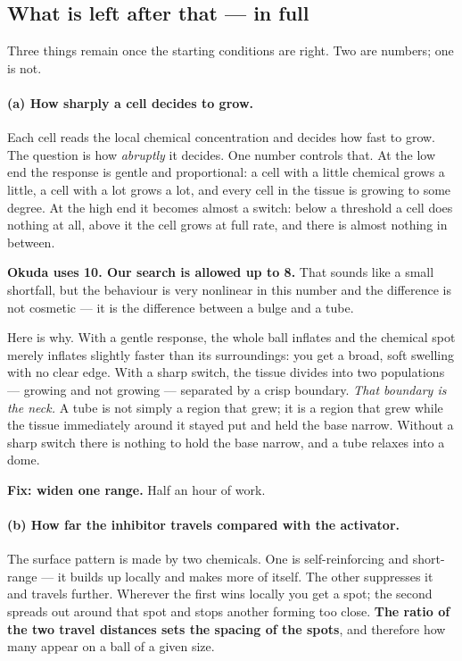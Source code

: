 \documentclass[11pt,a4paper]{article}
\begin{document}
\subsection{What is left after that --- in full}

Three things remain once the starting conditions are right. Two are numbers; one is not.

\paragraph{(a) How sharply a cell decides to grow.}
Each cell reads the local chemical concentration and decides how fast to grow. The question is how
\emph{abruptly} it decides. One number controls that. At the low end the response is gentle and
proportional: a cell with a little chemical grows a little, a cell with a lot grows a lot, and
every cell in the tissue is growing to some degree. At the high end it becomes almost a switch:
below a threshold a cell does nothing at all, above it the cell grows at full rate, and there is
almost nothing in between.

\textbf{Okuda uses 10. Our search is allowed up to 8.} That sounds like a small shortfall, but the
behaviour is very nonlinear in this number and the difference is not cosmetic --- it is the
difference between a bulge and a tube.

Here is why. With a gentle response, the whole ball inflates and the chemical spot merely inflates
slightly faster than its surroundings: you get a broad, soft swelling with no clear edge. With a
sharp switch, the tissue divides into two populations --- growing and not growing --- separated by
a crisp boundary. \emph{That boundary is the neck.} A tube is not simply a region that grew; it is
a region that grew while the tissue immediately around it stayed put and held the base narrow.
Without a sharp switch there is nothing to hold the base narrow, and a tube relaxes into a dome.

\textbf{Fix: widen one range.} Half an hour of work.

\paragraph{(b) How far the inhibitor travels compared with the activator.}
The surface pattern is made by two chemicals. One is self-reinforcing and short-range --- it builds
up locally and makes more of itself. The other suppresses it and travels further. Wherever the
first wins locally you get a spot; the second spreads out around that spot and stops another
forming too close. \textbf{The ratio of the two travel distances sets the spacing of the spots}, and
therefore how many appear on a ball of a given size.
\end{document}
